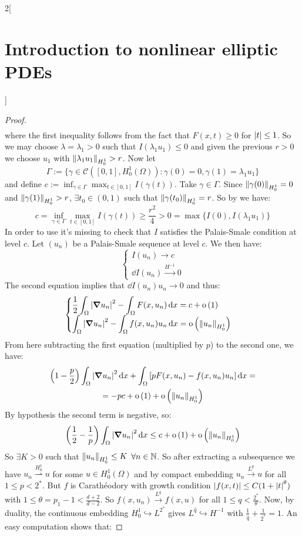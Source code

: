 \documentclass[../../../main_math.tex]{subfiles}
\begin{document}
\begin{multicols}{2}[\section{Introduction to nonlinear elliptic PDEs}]
\begin{proof}
\begin{multline*}
    \end{multline*}
    where the first inequality follows from the fact that $F(x,t)\geq 0$ for $\abs{t}\leq 1$. So we may choose $\lambda=\lambda_1>0$ such that $I(\lambda_1 u_1)\leq 0$ and given the previous $r>0$ we choose $u_1$ with $\left\|\lambda_1 u_1\right\|_{H_0^1}>r$. Now let
    $$
      \Gamma:=\{\gamma\in \mathcal{C}([0,1],H_0^1(\Omega)):\gamma(0)=0,\gamma(1)=\lambda_1 u_1\}
    $$
    and define $c:=\displaystyle \inf_{\gamma\in \Gamma}\max_{t\in [0,1]}I(\gamma(t))$. Take $\gamma\in \Gamma$. Since $\left\|\gamma(0)\right\|_{H_0^1}=0$ and $\left\|\gamma(1)\right\|_{H_0^1}> r$, $\exists t_0\in (0,1)$ such that $\left\|\gamma(t_0)\right\|_{H_0^1}=r$. So by  we have:
    $$
      c =\displaystyle \inf_{\gamma\in \Gamma}\max_{t\in [0,1]}I(\gamma(t))\geq \frac{r^2}{4}>0=\max\{I(0),I(\lambda_1 u_1)\}
    $$
    In order to use  it's missing to check that $I$ satisfies the Palais-Smale condition at level $c$. Let $(u_n)$ be a Palais-Smale sequence at level $c$. We then have:
    $$
      \begin{cases}
        I(u_n)\to c \\
        \dd{I(u_n)}\overset{H^{-1}}{\longrightarrow} 0
      \end{cases}$$
    The second equation implies that $\dd{I(u_n)}u_n\to 0$ and thus:
    $$
      \begin{cases}
        \displaystyle\frac{1}{2}\int_\Omega \abs{\grad u_n}^2-\int_\Omega F(x,u_n)\dd{x}=c+\mathrm{o}\left(1\right) \\
        \displaystyle\int_\Omega \abs{\grad u_n}^2-\int_\Omega f(x,u_n)u_n\dd{x}=\mathrm{o}\left(\left\|u_n\right\|_{H_0^1}\right)
      \end{cases}
    $$
    From here subtracting the first equation (multiplied by $p$) to the second one, we have:
    \begin{multline*}
      \left(1-\frac{p}{2}\right)\int_\Omega \abs{\grad u_n}^2\dd{x}+\int_\Omega \left[pF(x,u_n)-f(x,u_n)u_n\right]\dd{x}=\\
      =-pc+\mathrm{o}\left(1\right) + \mathrm{o}\left(\left\|u_n\right\|_{H_0^1}\right)
    \end{multline*}
    By hypothesis the second term is negative, so:
    $$
      \left(\frac{1}{2}- \frac{1}{p}\right)\int_\Omega \abs{\grad u_n}^2\dd{x}\leq c + \mathrm{o}\left(1\right) + \mathrm{o}\left(\left\|u_n\right\|_{H_0^1}\right)
    $$
    So $\exists K>0$ such that $\left\|u_n\right\|_{H_0^1}\leq K$ $\forall n\in\mathbb{N}$. So after extracting a subsequence we have $u_n\overset{H_0^1}{\rightharpoonup} u$ for some $u\in H_0^1(\Omega)$ and by compact embedding $u_n\overset{L^p}{\longrightarrow} u$ for all $1\leq p<2^*$. But $f$ is Carathéodory with growth condition $\abs{f(x,t)}\leq C(1+\abs{t}^{\theta})$ with $1\leq \theta =p_1-1<\frac{d+2}{d-2}$. So $f(x,u_n)\overset{L^q}{\longrightarrow} f(x,u)$ for all $1\leq q<\frac{2^*}{\theta}$. Now, by duality, the continuous embedding $H_0^1\hookrightarrow L^{2^*}$ gives $L^{\hat{q}} \hookrightarrow H^{-1}$ with $\frac{1}{\hat{q}}+\frac{1}{2^*}=1$. An easy computation shows that:

\end{proof}
\end{multicols}
\end{document}
